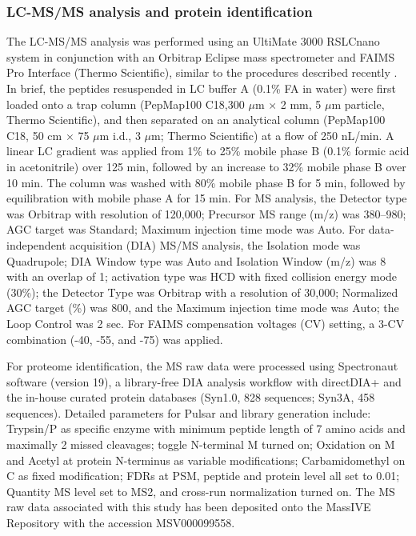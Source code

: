 \subsubsection{LC-MS/MS analysis and protein identification}
The LC-MS/MS analysis was performed using an UltiMate 3000 RSLCnano system in conjunction with an Orbitrap Eclipse mass spectrometer and FAIMS Pro Interface (Thermo Scientific), similar to the procedures described recently \citep{sun_-cell_2026}.
In brief, the peptides resuspended in LC buffer A (0.1\% FA in water) were first loaded onto a trap column (PepMap100 C18,300 $\mu$m $\times$ 2 mm, 5 $\mu$m particle, Thermo Scientific), and then separated on an analytical column (PepMap100 C18, 50 cm $\times$ 75 $\mu$m i.d., 3 $\mu$m; Thermo Scientific) at a flow of 250 nL/min.
A linear LC gradient was applied from 1\% to 25\% mobile phase B (0.1\% formic acid in acetonitrile) over 125 min, followed by an increase to 32\% mobile phase B over 10 min.
The column was washed with 80\% mobile phase B for 5 min, followed by equilibration with mobile phase A for 15 min.
For MS analysis, the Detector type was Orbitrap with resolution of 120,000; Precursor MS range (m/z) was 380–980; AGC target was Standard; Maximum injection time mode was Auto.
For data-independent acquisition (DIA) MS/MS analysis, the Isolation mode was Quadrupole; DIA Window type was Auto and Isolation Window (m/z) was 8 with an overlap of 1; activation type was HCD with fixed collision energy mode (30\%); the Detector Type was Orbitrap with a resolution of 30,000; Normalized AGC target (\%) was 800, and the Maximum injection time mode was Auto; the Loop Control was 2 sec.
For FAIMS compensation voltages (CV) setting, a 3-CV combination (-40, -55, and -75) was applied.

For proteome identification, the MS raw data were processed using Spectronaut software (version 19), a library-free DIA analysis workflow with directDIA+ and the in-house curated protein databases (Syn1.0, 828 sequences; Syn3A, 458 sequences).
Detailed parameters for Pulsar and library generation include: Trypsin/P as specific enzyme with minimum peptide length of 7 amino acids and maximally 2 missed cleavages; toggle N-terminal M turned on; Oxidation on M and Acetyl at protein N-terminus as variable modifications; Carbamidomethyl on C as fixed modification; FDRs at PSM, peptide and protein level all set to 0.01; Quantity MS level set to MS2, and cross-run normalization turned on.
The MS raw data associated with this study has been deposited onto the MassIVE Repository with the accession MSV000099558.

